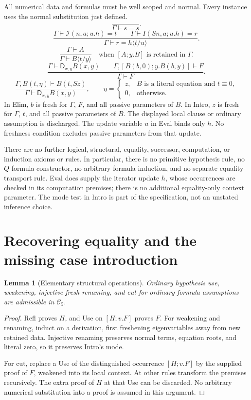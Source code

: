\documentclass[11pt]{article}
\newtheorem{lemma}[theorem]{Lemma}
\theoremstyle{definition}
\newcommand{\C}{\mathcal C_5}
\newcommand{\si}{\mathcal I}
\newcommand{\D}{\mathsf D}
\newcommand{\syn}{\equiv}
\begin{document}
All numerical data and formulas must be well scoped and normal. Every
instance uses the normal substitution just defined.
\[
\frac{}{\Gamma\vdash s=s}.\tag{Refl}
\]
\[
\frac{\Gamma\vdash\si(n,a;u.h)=t\qquad
      \Gamma\vdash I(Sn,a;u.h)=r}
     {\Gamma\vdash r=h\langle t/u\rangle}.\tag{Eval}
\]
\[
\frac{\Gamma\vdash A}{\Gamma\vdash B\langle t/y\rangle}
\quad\text{when }[A;y.B]\text{ is retained in }\Gamma.\tag{Use}
\]
\[
\frac{\Gamma\vdash\D_{x,y}B(x,y)\qquad
      \Gamma,[B(b,0);y.B(b,y)]\vdash F}
     {\Gamma\vdash F}.\tag{Elim}
\]
\[
\frac{\Gamma,B(t,\eta)\vdash B(t,Sz)}
     {\Gamma\vdash\D_{x,y}B(x,y)},\qquad
\eta=\begin{cases}
z,& B\text{ is a literal equation and }t\syn0,\\
0,&\text{otherwise}.
\end{cases}\tag{Intro}
\]
In Elim, $b$ is fresh for $\Gamma$, $F$, and all passive parameters of
$B$. In Intro, $z$ is fresh for $\Gamma$, $t$, and all passive parameters
of $B$. The displayed local clause or ordinary assumption is discharged.
The update variable $u$ in Eval binds only $h$. No freshness condition
excludes passive parameters from that update.

There are no further logical, structural, equality, successor, computation,
or induction axioms or rules. In particular, there is no primitive
hypothesis rule, no $Q$ formula constructor, no arbitrary formula induction,
and no separate equality-transport rule. Eval does supply the iterator
update $h$, whose occurrences are checked in its computation premises;
there is no additional equality-only context parameter. The mode test in
Intro is part of the specification, not an unstated inference choice.

\section{Recovering equality and the missing case introduction}

\begin{lemma}[Elementary structural operations]\label{lem:structure}
Ordinary hypothesis use, weakening, injective fresh renaming, and cut for
ordinary formula assumptions are admissible in $\C$.
\end{lemma}
\begin{proof}
Refl proves $H$, and Use on $[H;v.F]$ proves $F$. For weakening and
renaming, induct on a derivation, first freshening eigenvariables away from
new retained data. Injective renaming preserves normal terms, equation roots,
and literal zero, so it preserves Intro's mode.

For cut, replace a Use of the distinguished occurrence $[H;v.F]$ by
the supplied proof of $F$, weakened into its local context. At other rules
transform the premises recursively. The extra proof of $H$ at that Use
can be discarded. No arbitrary numerical substitution into a proof is
assumed in this argument.
\end{proof}
\end{document}
